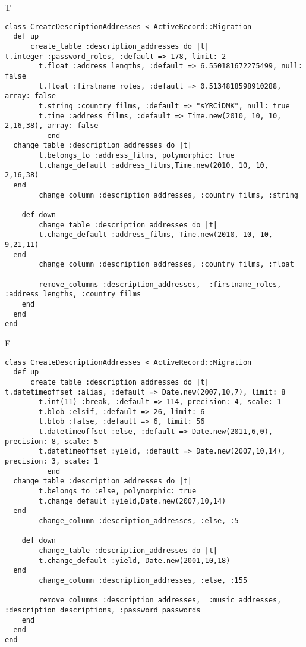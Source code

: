 T
\begin{verbatim}
class CreateDescriptionAddresses < ActiveRecord::Migration
  def up
	  create_table :description_addresses do |t|
t.integer :password_roles, :default => 178, limit: 2
		t.float :address_lengths, :default => 6.550181672275499, null: false
		t.float :firstname_roles, :default => 0.5134818598910288, array: false
		t.string :country_films, :default => "sYRCiDMK", null: true
		t.time :address_films, :default => Time.new(2010, 10, 10, 2,16,38), array: false
		  end
  change_table :description_addresses do |t|
		t.belongs_to :address_films, polymorphic: true
 		t.change_default :address_films,Time.new(2010, 10, 10, 2,16,38)
  end
 		change_column :description_addresses, :country_films, :string
   
	def down
		change_table :description_addresses do |t|
		t.change_default :address_films, Time.new(2010, 10, 10, 9,21,11)
  end
 		change_column :description_addresses, :country_films, :float
   
		remove_columns :description_addresses,  :firstname_roles, :address_lengths, :country_films 
    end 
  end
end

\end{verbatim}

F
\begin{verbatim}
class CreateDescriptionAddresses < ActiveRecord::Migration
  def up
	  create_table :description_addresses do |t|
t.datetimeoffset :alias, :default => Date.new(2007,10,7), limit: 8
		t.int(11) :break, :default => 114, precision: 4, scale: 1
		t.blob :elsif, :default => 26, limit: 6
		t.blob :false, :default => 6, limit: 56
		t.datetimeoffset :else, :default => Date.new(2011,6,0), precision: 8, scale: 5
		t.datetimeoffset :yield, :default => Date.new(2007,10,14), precision: 3, scale: 1
		  end
  change_table :description_addresses do |t|
		t.belongs_to :else, polymorphic: true
 		t.change_default :yield,Date.new(2007,10,14)
  end
 		change_column :description_addresses, :else, :5
   
	def down
		change_table :description_addresses do |t|
		t.change_default :yield, Date.new(2001,10,18)
  end
 		change_column :description_addresses, :else, :155
   
		remove_columns :description_addresses,  :music_addresses, :description_descriptions, :password_passwords 
    end 
  end
end

\end{verbatim}

